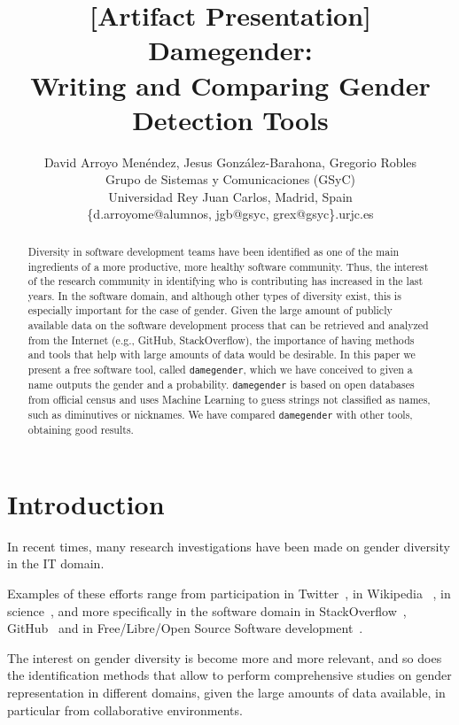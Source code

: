 \documentclass[a4paper]{article}
\title{[Artifact Presentation] Damegender: \\ Writing and Comparing Gender Detection Tools}
\author{
David Arroyo Menéndez, Jesus González-Barahona, Gregorio Robles \\ Grupo de Sistemas y Comunicaciones (GSyC) \\ Universidad Rey Juan Carlos, Madrid, Spain \\ \{d.arroyome@alumnos, jgb@gsyc, grex@gsyc\}.urjc.es
}
\begin{document}
\maketitle

\begin{abstract}
Diversity in software development teams have been identified as one of the main ingredients of a more productive, more healthy software community.
Thus, the interest of the research community in identifying who is contributing has increased in the last years.
In the software domain, and although other types of diversity exist, this is especially important for the case of gender.
Given the large amount of publicly available data on the software development process that can be retrieved and analyzed from the Internet (e.g., GitHub, StackOverflow), the importance of having methods and tools that help with large amounts of data would be desirable.
In this paper we present a free software tool, called \texttt{damegender}, which we have conceived to given a name outputs the gender and a probability.
\texttt{damegender} is based on open databases from official census and uses Machine Learning to guess strings not classified as names, such as diminutives or nicknames.
We have compared \texttt{damegender} with other tools, obtaining good results.

\end{abstract}


\section{Introduction}

In recent times, many research investigations have been made on gender diversity in the IT domain.

Examples of these efforts range from participation in Twitter~\cite{burger2011discriminating,mislove2011understanding},
in Wikipedia ~\cite{antin2011gender,hill2013wikipedia}, in science~\cite{holman2018gender,dollar1999gender}, and more specifically in the software domain in StackOverflow~\cite{vasilescu2012gender}, GitHub~\cite{vasilescu2015gender} and in Free/Libre/Open Source Software development~\cite{robles2014floss}.

The interest on gender diversity is become more and more relevant, and so does the identification methods that allow to perform comprehensive studies on gender representation in different domains, given the large amounts of data available, in particular from collaborative environments.
\end{document}
